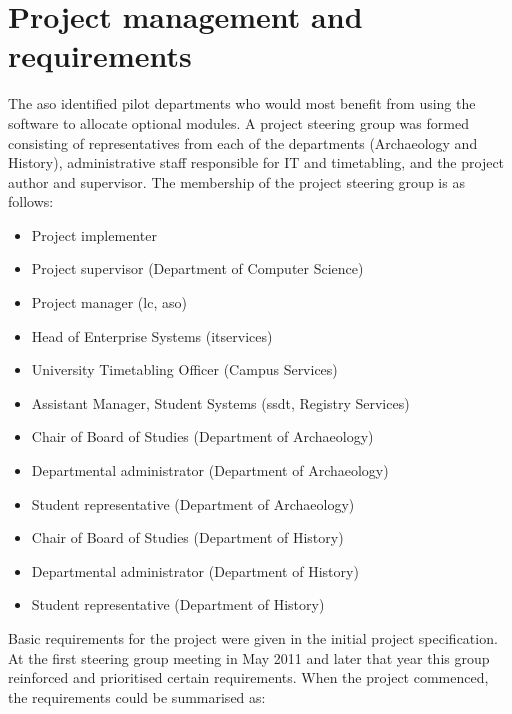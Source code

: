 
\section{Project management and requirements}
\label{sec:requirements}

The \gls{aso} identified pilot departments who would most benefit from using
the software to allocate optional modules. A project steering group was formed
consisting of representatives from each of the departments (Archaeology and
History), administrative staff responsible for IT and timetabling, and the
project author and supervisor. The membership of the project steering group is
as follows:

\begin{itemize}
  \item Project implementer
  \item Project supervisor (Department of Computer Science)
  \item Project manager (\gls{lc}, \gls{aso})
  \item Head of Enterprise Systems (\gls{itservices})
  \item University Timetabling Officer (Campus Services)
  \item Assistant Manager, Student Systems (\gls{ssdt}, Registry Services)
  \item Chair of Board of Studies (Department of Archaeology)
  \item Departmental administrator (Department of Archaeology)
  \item Student representative (Department of Archaeology)
  \item Chair of Board of Studies (Department of History)
  \item Departmental administrator (Department of History)
  \item Student representative (Department of History)
\end{itemize}

Basic requirements for the project were given in the initial project
specification. At the first steering group meeting in May 2011 and later that
year this group reinforced and prioritised certain requirements. When the
project commenced, the requirements could be summarised as:


